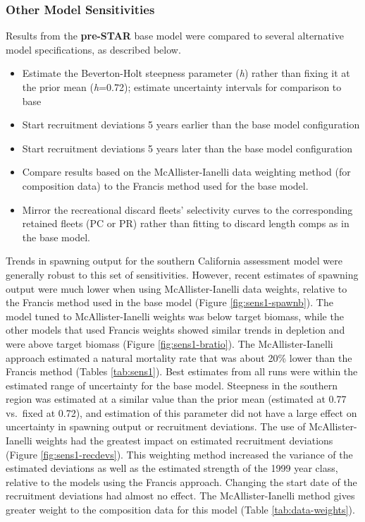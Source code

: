\documentclass[
  english,
  a4paper,
]{article}
\providecommand{\tightlist}{%
  \setlength{\itemsep}{0pt}\setlength{\parskip}{0pt}}
\begin{document}
\hypertarget{other-model-sensitivities}{%
\subsubsection{Other Model Sensitivities}\label{other-model-sensitivities}}

Results from the \textbf{pre-STAR} base model were compared to several alternative model specifications, as described below.

\begin{itemize}
\tightlist
\item
  Estimate the Beverton-Holt steepness parameter (\emph{h}) rather than fixing it at the prior mean (\emph{h}=0.72); estimate uncertainty intervals for comparison to base
\item
  Start recruitment deviations 5 years earlier than the base model configuration
\item
  Start recruitment deviations 5 years later than the base model configuration
\item
  Compare results based on the McAllister-Ianelli data weighting method (for composition data) to the Francis method used for the base model.
\item
  Mirror the recreational discard fleets' selectivity curves to the corresponding retained fleets (PC or PR) rather than fitting to discard length comps as in the base model.
\end{itemize}

Trends in spawning output for the southern California assessment model were generally robust to this set of sensitivities. However, recent estimates of spawning output were much lower when using McAllister-Ianelli data weights, relative to the Francis method used in the base model (Figure \ref{fig:sens1-spawnb}). The model tuned to McAllister-Ianelli weights was below target biomass, while the other models that used Francis weights showed similar trends in depletion and were above target biomass (Figure \ref{fig:sens1-bratio}). The McAllister-Ianelli approach estimated a natural mortality rate that was about 20\% lower than the Francis method (Tables \ref{tab:sens1}). Best estimates from all runs were within the estimated range of uncertainty for the base model. Steepness in the southern region was estimated at a similar value than the prior mean (estimated at 0.77 vs.~fixed at 0.72), and estimation of this parameter did not have a large effect on uncertainty in spawning output or recruitment deviations. The use of McAllister-Ianelli weights had the greatest impact on estimated recruitment deviations (Figure \ref{fig:sens1-recdevs}). This weighting method increased the variance of the estimated deviations as well as the estimated strength of the 1999 year class, relative to the models using the Francis approach. Changing the start date of the recruitment deviations had almost no effect. The McAllister-Ianelli method gives greater weight to the composition data for this model (Table \ref{tab:data-weights}).
\end{document}
